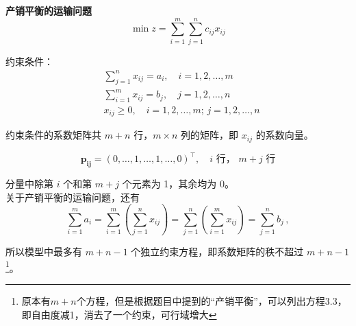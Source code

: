 \begin{exbox}{\textbf{产销平衡的运输问题}}
\begin{equation}
\min z = \sum_{i=1}^{m} \sum_{j=1}^{n} c_{ij} x_{ij}
\end{equation}

约束条件：
\begin{align}
&\sum_{j=1}^{n} x_{ij} = a_i, \quad i = 1, 2, \dots, m \tag{m 个约束方程} \\
&\sum_{i=1}^{m} x_{ij} = b_j, \quad j = 1, 2, \dots, n \tag{n 个约束方程} \\
&x_{ij} \geq 0, \quad i = 1, 2, \dots, m; \, j = 1, 2, \dots, n \tag{m $\times$ n 个变量}
\end{align}

约束条件的系数矩阵共 $m + n$ 行，$m \times n$ 列的矩阵，即 $x_{ij}$ 的系数向量。

\begin{equation}
\mathbf{p_{ij}} = (0, \dots, 1, \dots, 1, \dots, 0)^{\top}, \quad i \text{ 行， } m+j \text{ 行}
\end{equation}

分量中除第 $i$ 个和第 $m+j$ 个元素为 1，其余均为 0。
\\
关于产销平衡的运输问题，还有
\begin{equation}
\sum_{i=1}^{m} a_i = \sum_{i=1}^{m} \left( \sum_{j=1}^{n} x_{ij} \right) = \sum_{j=1}^{n} \left( \sum_{i=1}^{m} x_{ij} \right) = \sum_{j=1}^{n} b_j \,,
\end{equation}

所以模型中最多有 $m+n-1$ 个独立约束方程，即系数矩阵的秩不超过 $m+n-1$\footnote{原本有$m+n$个方程，但是根据题目中提到的“产销平衡”，可以列出方程3.3，即自由度减1，消去了一个约束，可行域增大}。
\end{exbox}

